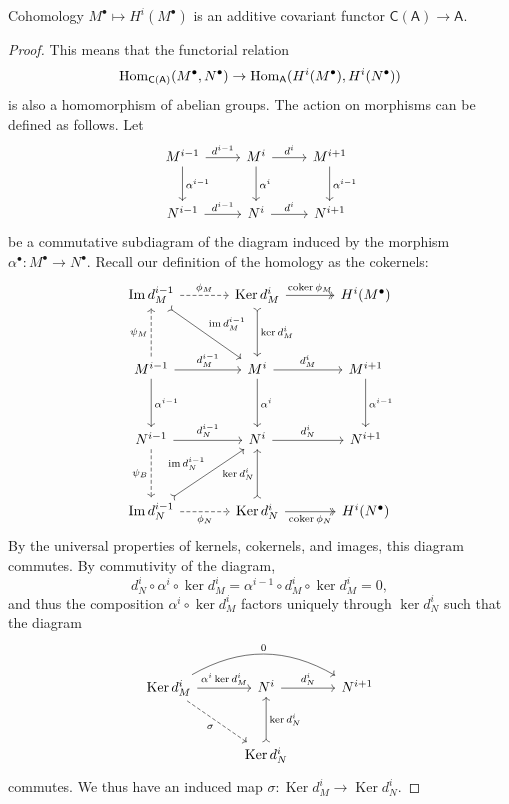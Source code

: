 \begin{lemma}\label{lma:9.3.2}
	Cohomology $M^\bullet \mapsto H^i(M^\bullet )$ is an additive covariant functor $\mathsf{C} (\mathsf{A} )\to \mathsf{A} $.
\end{lemma}
\begin{proof}
	This means that the functorial relation
	\[
		\operatorname{Hom}_{\mathsf{C} (\mathsf{A} )}(M^\bullet , N^\bullet ) \to \operatorname{Hom}_{\mathsf{A} }(H^i(M^\bullet ), H^i(N^\bullet )) 
	\]
	is also a homomorphism of abelian groups. The action on morphisms can be defined as follows. Let
	\[\begin{tikzcd}[row sep = 2.5em, column sep = 2.5em]
		M^{i-1} \arrow[r, "d^{i-1}"]\arrow[d, "\alpha ^{i-1} "]&M^i\arrow[d, "\alpha^i"]\arrow[r, "d^i"]&M^{i+1} \arrow[d, "\alpha ^{i-1} "]\\
		N^{i-1} \arrow[r, "d^{i-1} "]&N^{i} \arrow[r, "d^{i} "]&N^{i+1} 
	\end{tikzcd}\]
	be a commutative subdiagram of the diagram induced by the morphism $\alpha ^\bullet : M^\bullet  \to N^\bullet $. Recall our definition of the homology as the cokernels:
	\[\begin{tikzcd}[row sep = 3.5em, column sep = 3.5em]
		\operatorname{Im}d_M^{i-1} \arrow[dr, "\im d^{i-1}_M ", tail]\arrow[r, dashed, "\phi _M"]&\operatorname{Ker} d^{i}_M \arrow[d, "\ker d^i_M", tail]\arrow[r, two heads, "\coker \phi _M"]&H^i(M^\bullet )\\
		M^{i-1}\arrow[u, dashed, "\psi _M"] \arrow[r, "d^{i-1}_M"]\arrow[d, "\alpha ^{i-1} "]&M^i\arrow[d, "\alpha^i"]\arrow[r, "d^i_M"]&M^{i+1} \arrow[d, "\alpha ^{i-1} "]\\
		N^{i-1}\arrow[d, dashed, "\psi _B"']\arrow[r, "d^{i-1}_N "]&N^{i} \arrow[r, "d^{i}_N "]&N^{i+1} \\
		\operatorname{Im}d_N^{i-1} \arrow[r, dashed, "\phi _N"']\arrow[ur, tail, "\im d^{i-1}_N "]&\operatorname{Ker}d^i_N \arrow[u, "\ker d^i_N", tail]\arrow[r, two heads, "\coker \phi_N"']&H^i(N^\bullet )
	\end{tikzcd}\]
	By the universal properties of kernels, cokernels, and images, this diagram commutes. By commutivity of the diagram,
	\[
		d^i_N\circ \alpha ^i\circ \ker d^i_M=\alpha ^{i-1} \circ d_M^i\circ \ker d_M^i=0,
	\]
	and thus the composition $\alpha ^i\circ \ker d_M^i$ factors uniquely through $\ker d_N^i$ such that the diagram
	\[\begin{tikzcd}[row sep =  3em, column sep = 3em]
		\operatorname{Ker}d^i_M\arrow[dr, dashed, "\sigma "'] \arrow[r, "\alpha ^i \ker d^i_M"]\arrow[rr, bend left, "0"]&N^i\arrow[r, "d^i_N"]&N^{i+1} \\
												&\operatorname{Ker}d_N^i \arrow[u, tail, "\ker d^i_N"']
	\end{tikzcd}\]
	commutes. We thus have an induced map $\sigma : \operatorname{Ker}d_M^i  \to \operatorname{Ker} d_N^i $. 


\end{proof}
